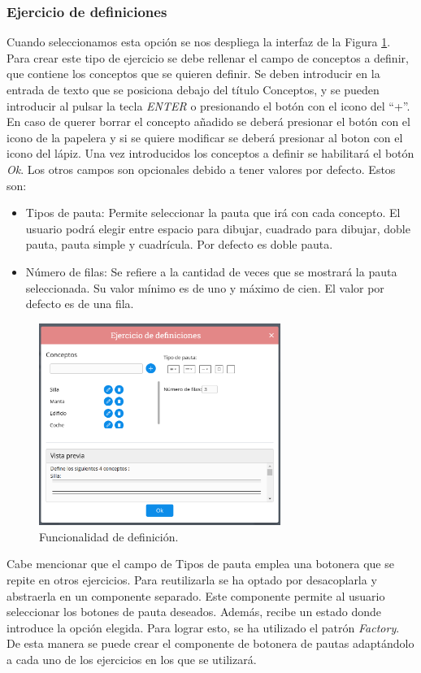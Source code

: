 \subsubsection{Ejercicio de definiciones}
Cuando seleccionamos esta opción se nos despliega la interfaz de la Figura \ref{fig:funcionalidadDefinicion}. Para crear este tipo de ejercicio se debe rellenar el campo de conceptos a definir, que contiene los conceptos que se quieren definir. Se deben introducir en la entrada de texto que se posiciona debajo del título Conceptos, y  se pueden introducir al pulsar  la tecla \textit{ENTER} o presionando el botón con el icono del ``+''. En caso de querer borrar el concepto añadido se deberá presionar el botón con el icono de la papelera y si se quiere modificar se deberá presionar al boton con el icono del lápiz.
Una vez introducidos los conceptos a definir se habilitará el botón \textit{Ok}. Los otros campos son opcionales debido a tener valores por defecto. Estos son:
\begin{itemize}
  \item Tipos de pauta: Permite seleccionar la pauta que irá con cada concepto. El usuario podrá elegir entre espacio para dibujar, cuadrado para dibujar, doble pauta, pauta simple y cuadrícula. Por defecto es doble pauta.
  \item Número de filas: Se refiere a la cantidad de veces que se mostrará la pauta seleccionada. Su valor mínimo es de uno y máximo de cien. El valor por defecto es de una fila.
\end{itemize}
\begin{figure}[ht!]
  \centering
  \includegraphics[width=0.7\textwidth]{Imagenes/Funcionalidades/EjercicioDefinicion.png}
  \caption{Funcionalidad de definición.}
  \label{fig:funcionalidadDefinicion}
\end{figure}
Cabe mencionar que el campo de Tipos de pauta emplea una botonera que se repite en otros ejercicios. Para reutilizarla se ha optado por desacoplarla y abstraerla en un componente separado. Este componente permite al usuario seleccionar los botones de pauta deseados. Además, recibe un estado donde introduce la opción elegida.
Para lograr esto, se ha utilizado el patrón \textit{Factory}. De esta manera se puede crear el componente de botonera de pautas adaptándolo a cada uno de los ejercicios en los que se utilizará.

